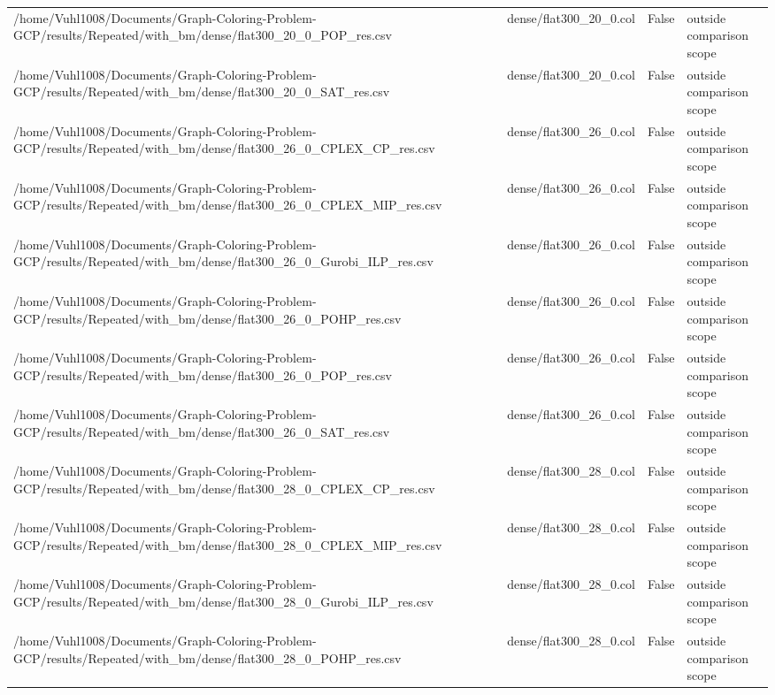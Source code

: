 \begin{table}[htbp]
\begin{tabular}{llll}
/home/Vuhl1008/Documents/Graph-Coloring-Problem-GCP/results/Repeated/with\_bm/dense/flat300\_20\_0\_POP\_res.csv & dense/flat300\_20\_0.col & False & outside comparison scope \\
/home/Vuhl1008/Documents/Graph-Coloring-Problem-GCP/results/Repeated/with\_bm/dense/flat300\_20\_0\_SAT\_res.csv & dense/flat300\_20\_0.col & False & outside comparison scope \\
/home/Vuhl1008/Documents/Graph-Coloring-Problem-GCP/results/Repeated/with\_bm/dense/flat300\_26\_0\_CPLEX\_CP\_res.csv & dense/flat300\_26\_0.col & False & outside comparison scope \\
/home/Vuhl1008/Documents/Graph-Coloring-Problem-GCP/results/Repeated/with\_bm/dense/flat300\_26\_0\_CPLEX\_MIP\_res.csv & dense/flat300\_26\_0.col & False & outside comparison scope \\
/home/Vuhl1008/Documents/Graph-Coloring-Problem-GCP/results/Repeated/with\_bm/dense/flat300\_26\_0\_Gurobi\_ILP\_res.csv & dense/flat300\_26\_0.col & False & outside comparison scope \\
/home/Vuhl1008/Documents/Graph-Coloring-Problem-GCP/results/Repeated/with\_bm/dense/flat300\_26\_0\_POHP\_res.csv & dense/flat300\_26\_0.col & False & outside comparison scope \\
/home/Vuhl1008/Documents/Graph-Coloring-Problem-GCP/results/Repeated/with\_bm/dense/flat300\_26\_0\_POP\_res.csv & dense/flat300\_26\_0.col & False & outside comparison scope \\
/home/Vuhl1008/Documents/Graph-Coloring-Problem-GCP/results/Repeated/with\_bm/dense/flat300\_26\_0\_SAT\_res.csv & dense/flat300\_26\_0.col & False & outside comparison scope \\
/home/Vuhl1008/Documents/Graph-Coloring-Problem-GCP/results/Repeated/with\_bm/dense/flat300\_28\_0\_CPLEX\_CP\_res.csv & dense/flat300\_28\_0.col & False & outside comparison scope \\
/home/Vuhl1008/Documents/Graph-Coloring-Problem-GCP/results/Repeated/with\_bm/dense/flat300\_28\_0\_CPLEX\_MIP\_res.csv & dense/flat300\_28\_0.col & False & outside comparison scope \\
/home/Vuhl1008/Documents/Graph-Coloring-Problem-GCP/results/Repeated/with\_bm/dense/flat300\_28\_0\_Gurobi\_ILP\_res.csv & dense/flat300\_28\_0.col & False & outside comparison scope \\
/home/Vuhl1008/Documents/Graph-Coloring-Problem-GCP/results/Repeated/with\_bm/dense/flat300\_28\_0\_POHP\_res.csv & dense/flat300\_28\_0.col & False & outside comparison scope \\

\end{tabular}
\end{table}
